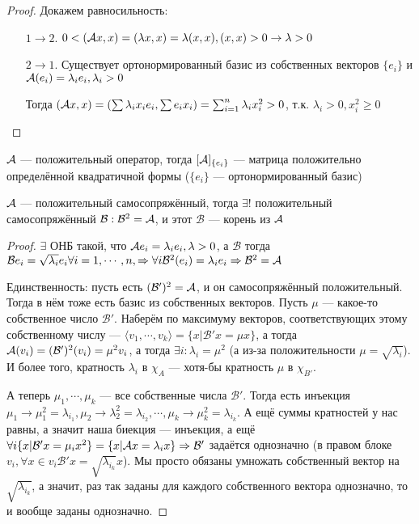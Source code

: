 \begin{proof}
	Докажем равносильность:


    \begin{enumerate}
	\item[$1 \to 2$.] $0 < (\mathcal{A} x, x) = (\lambda x, x) = \lambda (x, x), (x, x) > 0 \to \lambda > 0$
	\item[$2 \to 1$.] Существует ортонормированный базис из собственных векторов $\{ e_i \}$ и $\mathcal{A}(e_i) = \lambda_i e_i, \lambda_i > 0$

		Тогда $(\mathcal{A} x, x) = (\sum \lambda_i x_i e_i, \sum e_i x_i) = \sum_{i=1}^n \lambda_i x_i^2 > 0$, т.к. $\lambda_i > 0, x_i^2 \ge 0$
    \end{enumerate}
\end{proof}

\begin{remark}
	$\mathcal{A}$ --- положительный оператор, тогда $[\mathcal{A}]_{\{ e_i \}}$ --- матрица положительно определённой квадратичной формы ($\{e_i\}$ --- ортонормированный базис)
\end{remark}
\begin{theorem}
	$\mathcal{A}$ --- положительный самосопряжённый, тогда $\exists ! $ положительный самосопряжённый $\mathcal{B} : \mathcal{B}^2 = \mathcal{A}$, и этот $\mathcal{B}$ --- корень из $\mathcal{A}$
\end{theorem}
\begin{proof}
    $\exists$ ОНБ такой, что $\mathcal{A} e_i = \lambda_i e_i, \lambda > 0$, а $\mathcal{B}$ тогда $\mathcal{B} e_i = \sqrt{\lambda_i} e_i \forall i = 1, \cdots, n, \Rightarrow \forall i \mathcal{B}^2(e_i) = \lambda_i e_i \Rightarrow \mathcal{B}^2 = \mathcal{A}$ 

    Единственность: пусть есть $(\mathcal{B}')^2 = \mathcal{A}$, и он самосопряжённый положительный. Тогда в нём тоже есть базис из собственных векторов. Пусть $\mu$ --- какое-то собственное число $\mathcal{B}'$. Наберём по максимуму векторов, соответствующих этому собственному числу --- $\langle v_1, \cdots, v_k\rangle = \{x | \mathcal{B}' x = \mu x  \}$, а тогда $\mathcal{A}(v_i) = (\mathcal{B}')^2 (v_i) = \mu^2 v_i$, а тогда $\exists i: \lambda_i = \mu^2$ (а из-за положительности $\mu = \sqrt{\lambda_i}$). И более того, кратность $\lambda_i$ в $\chi_A$ --- хотя-бы кратность $\mu$ в $\chi_{B'}$. 

    А теперь $\mu_1, \cdots, \mu_k$ --- все собственные числа $\mathcal{B}'$. Тогда есть инъекция $\mu_1 \to \mu_1^2 = \lambda_{i_1}, \mu_2 \to \lambda_2^2 = \lambda_{i_2}, \cdots, \mu_k \to \mu_k^2 = \lambda_{i_k}$. А ещё суммы кратностей у нас равны, а значит наша биекция --- инъекция, а ещё $\forall i \{x | \mathcal{B}' x = \mu_i x^2\} = \{ x | \mathcal{A} x = \lambda_i x\} \Rightarrow \mathcal{B}'$ задаётся однозначно (в правом блоке $v_i, \forall x \in v_i \mathcal{B}' x = \sqrt{\lambda_{i_k}} x$). Мы просто обязаны умножать собственный вектор на $\sqrt{\lambda_{i_k}}$, а значит, раз так заданы для каждого собственного вектора однозначно, то и вообще заданы однозначно.
\end{proof}

